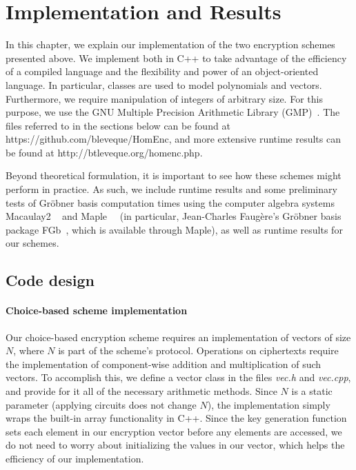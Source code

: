\documentclass[11pt]{report}
\begin{document}
\chapter{Implementation and Results}
\label{chap:implementation}
In this chapter, we explain our implementation of the two encryption schemes presented above. We implement both in C++ to take advantage of the efficiency of a compiled language and the flexibility and power of an object-oriented language. In particular, classes are used to model polynomials and vectors. Furthermore, we require manipulation of integers of arbitrary size. For this purpose, we use the GNU Multiple Precision Arithmetic Library (GMP)~\cite{gmp-manual}. The files referred to in the sections below can be found at https://github.com/bleveque/HomEnc, and more extensive runtime results can be found at http://btleveque.org/homenc.php.

Beyond theoretical formulation, it is important to see how these schemes might perform in practice. As such, we include runtime results and some preliminary tests of Gr\"obner basis computation times using the computer algebra systems Macaulay2 ~\cite{M2} and Maple~\cite{maple-user-manual}~\cite{maple-programming-guide} (in particular, Jean-Charles Faug\`ere's Gr\"obner basis package FGb~\cite{faugere-fgb}, which is available through Maple), as well as runtime results for our schemes.

\section{Code design}
\subsubsection{Choice-based scheme implementation}
Our choice-based encryption scheme requires an implementation of vectors of size $N$, where $N$ is part of the scheme's protocol. Operations on ciphertexts require the implementation of component-wise addition and multiplication of such vectors. To accomplish this, we define a vector class in the files \emph{vec.h} and \emph{vec.cpp}, and provide for it all of the necessary arithmetic methods. Since $N$ is a static parameter (applying circuits does not change $N$), the implementation simply wraps the built-in array functionality in C++. Since the key generation function sets each element in our encryption vector before any elements are accessed, we do not need to worry about initializing the values in our vector, which helps the efficiency of our implementation.
\end{document}
